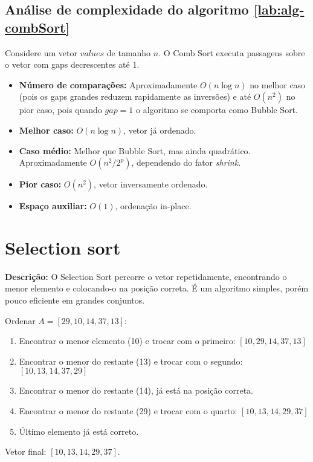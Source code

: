 \subsection{Análise de complexidade do algoritmo \ref{lab:alg-combSort}}
Considere um vetor $values$ de tamanho $n$. O Comb Sort executa passagens sobre o vetor com gaps decrescentes até 1.

\begin{itemize}
    \item \textbf{Número de comparações:}  
    Aproximadamente $O(n \log n)$ no melhor caso (pois os gaps grandes reduzem rapidamente as inversões) e até $O(n^2)$ no pior caso, pois quando $gap=1$ o algoritmo se comporta como Bubble Sort.
    
    \item \textbf{Melhor caso:} $O(n \log n)$, vetor já ordenado.
    \item \textbf{Caso médio:} Melhor que Bubble Sort, mas ainda quadrático. Aproximadamente $O(n^2 / 2^p)$, dependendo do fator \textit{shrink}.
    \item \textbf{Pior caso:} $O(n^2)$, vetor inversamente ordenado.
    \item \textbf{Espaço auxiliar:} $O(1)$, ordenação in-place.
\end{itemize}

\section{Selection sort}
\textbf{Descrição:} O Selection Sort percorre o vetor repetidamente, encontrando o menor elemento e colocando-o na posição correta. É um algoritmo simples, porém pouco eficiente em grandes conjuntos.

\begin{exmp}
Ordenar $A = [29, 10, 14, 37, 13]$:

\begin{enumerate}
    \item Encontrar o menor elemento (10) e trocar com o primeiro: $[10, 29, 14, 37, 13]$
    \item Encontrar o menor do restante (13) e trocar com o segundo: $[10, 13, 14, 37, 29]$
    \item Encontrar o menor do restante (14), já está na posição correta.
    \item Encontrar o menor do restante (29) e trocar com o quarto: $[10, 13, 14, 29, 37]$
    \item Último elemento já está correto.
\end{enumerate}

Vetor final: $[10, 13, 14, 29, 37]$.
\end{exmp}

